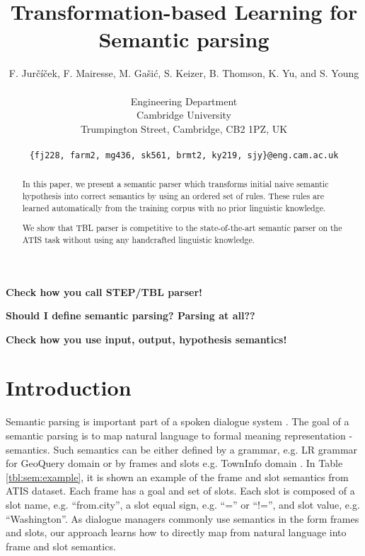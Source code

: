 \documentclass[11pt]{article}
\title{Transformation-based Learning for Semantic parsing}
\author{F. Jur\v{c}\'{i}\v{c}ek, F. Mairesse, M. Ga\v{s}i\'{c}, S. Keizer, B. Thomson, K. Yu, and S. Young \\
\\
Engineering Department \\
Cambridge University \\
Trumpington Street, Cambridge, CB2 1PZ, UK \\
\\
{\tt \{fj228, farm2, mg436, sk561, brmt2, ky219, sjy\}@eng.cam.ac.uk}
}
\date{}
\begin{document}
\maketitle
\begin{abstract}
In this paper, we present a semantic parser which transforms initial naive semantic hypothesis into correct semantics by using an ordered set of rules. These rules are learned automatically from the training corpus with no prior linguistic knowledge.

We show that TBL parser is competitive to the state-of-the-art semantic parser on the ATIS task without using any handcrafted linguistic knowledge.

\end{abstract}

\textbf{Check how you call STEP/TBL parser!}

\textbf{Should I define semantic parsing? Parsing at all??}

\textbf{Check how you use input, output, hypothesis semantics!}


\section{Introduction}
Semantic parsing is important part of a spoken dialogue system \cite{williams07}. The goal of a semantic parsing is to map natural language to formal meaning representation - semantics. Such semantics can be either defined by a grammar, e.g. LR grammar for GeoQuery domain \cite{kate05} or by frames and slots e.g. TownInfo domain \cite{thomson08}. In Table \ref{tbl:sem:example}, it is shown an example of the frame and slot semantics from ATIS dataset. Each frame has a goal and set of slots. Each slot is composed of a slot name, e.g. ``from.city'', a slot equal sign, e.g. ``='' or ``!='', and slot value, e.g. ``Washington''. As dialogue managers commonly use semantics in the form frames and slots, our approach learns how to directly map from natural language into frame and slot semantics.

\end{document}
